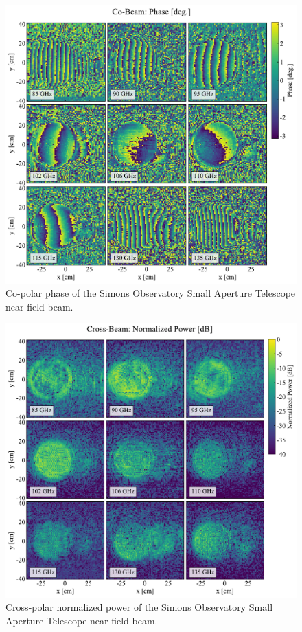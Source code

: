 \begin{figure}
    \centering
    \includegraphics[width = \textwidth]{Figures/SAT_MF1_co-phase.pdf}
    \caption{Co-polar phase of the Simons Observatory Small Aperture Telescope near-field beam.}
    \label{fig:sat_mf_cophase}
\end{figure}

\begin{figure}
    \centering
    \includegraphics[width = \textwidth]{Figures/SAT_MF1_cr-beam.pdf}
    \caption{Cross-polar normalized power of the Simons Observatory Small Aperture Telescope near-field beam.}
    \label{fig:sat_mf_crbeam}
\end{figure}

